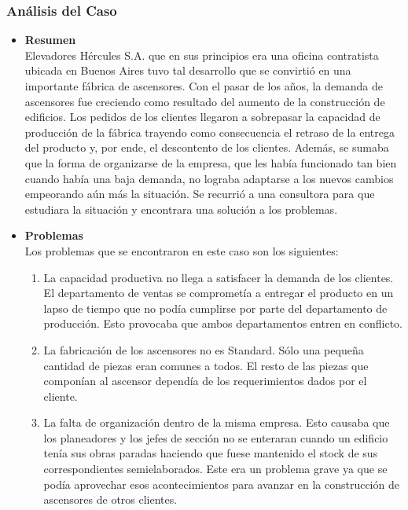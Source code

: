 \documentclass[a4paper,10pt,titlepage]{article}
\begin{document}
\subsubsection{An\'alisis del Caso}

\begin{itemize}
 \item \textbf{Resumen}\\
      Elevadores H\'ercules S.A. que en sus principios era una oficina contratista ubicada en Buenos Aires tuvo tal desarrollo que se convirti\'o 
      en una importante f\'abrica de ascensores. Con el pasar de los a\~nos, la demanda de ascensores fue creciendo como resultado del aumento de 
      la construcci\'on de edificios. Los pedidos de los clientes llegaron a sobrepasar la capacidad de producci\'on de la f\'abrica trayendo como 
      consecuencia el retraso de la entrega del producto y, por ende, el descontento de los clientes. Adem\'as, se sumaba que la forma de 
      organizarse de la empresa, que les hab\'ia funcionado tan bien cuando hab\'ia una baja demanda, no lograba adaptarse a los nuevos cambios
      empeorando a\'un m\'as la situaci\'on. Se recurri\'o a una consultora para que estudiara la situaci\'on y encontrara una soluci\'on a los problemas.
 \item \textbf{Problemas}\\
      Los problemas que se encontraron en este caso son los siguientes:
      \begin{enumerate}
	\item La capacidad productiva no llega a satisfacer la demanda de los clientes. El departamento de ventas se compromet\'ia a entregar el 
	producto en un lapso de tiempo que no pod\'ia cumplirse por parte del departamento de producci\'on. Esto provocaba que ambos departamentos
	entren en conflicto.
	\item La fabricaci\'on de los ascensores no es Standard. S\'olo una peque\~na cantidad de piezas eran comunes a todos. El resto de las piezas 
	que compon\'ian al ascensor depend\'ia de los requerimientos dados por el cliente.
	\item La falta de organizaci\'on dentro de la misma empresa. Esto causaba que los planeadores y los jefes de secci\'on no se enteraran cuando 
	un edificio ten\'ia sus obras paradas haciendo que fuese mantenido el stock de sus correspondientes semielaborados. Este era un problema grave 
	ya que se pod\'ia aprovechar esos acontecimientos para avanzar en la construcci\'on de ascensores de otros clientes.
      \end{enumerate}

\end{itemize}
\end{document}
